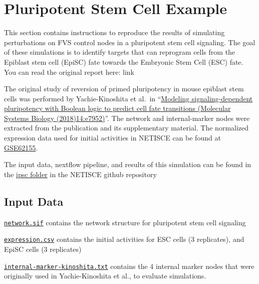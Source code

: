 \documentclass[
]{book}
\begin{document}
\hypertarget{pluripotent-stem-cell-example}{%
\chapter{Pluripotent Stem Cell Example}\label{pluripotent-stem-cell-example}}

This section contains instructions to reproduce the results of simulating perturbations on FVS control nodes in a pluripotent stem cell signaling. The goal of these simulations is to identify targets that can reprogram cells from the Epiblast stem cell (EpiSC) fate towards the Embryonic Stem Cell (ESC) fate. You can read the original report here: link

The original study of reversion of primed pluripotency in mouse epiblast stem cells was performed by Yachie-Kinoshita et al.~in ``\href{https://www.embopress.org/doi/full/10.15252/msb.20177952}{Modeling signaling-dependent pluripotency with Boolean logic to predict cell fate transitions (Molecular Systems Biology (2018)14:e7952)}''. The network and internal-marker nodes were extracted from the publication and its supplementary material. The normalized expression data used for initial activities in NETISCE can be found at \href{https://www.ncbi.nlm.nih.gov/geo/query/acc.cgi?acc=GSE62155}{GSE62155}.

The input data, nextflow pipeline, and results of this simulation can be found in the \href{https://github.com/VeraLiconaResearchGroup/Netisce/tree/main/ipsc_validation}{ipsc folder} in the NETISCE github repository

\hypertarget{input-data-1}{%
\section{Input Data}\label{input-data-1}}

\href{https://github.com/VeraLiconaResearchGroup/Netisce/blob/main/ipsc_validation/input_data/network.sif}{\texttt{network.sif}} contains the network structure for pluripotent stem cell signaling

\href{https://github.com/VeraLiconaResearchGroup/Netisce/blob/main/ipsc_validation/input_data/expression.csv}{\texttt{expression.csv}} contains the initial activities for ESC cells (3 replicates), and EpiSC cells (3 replicates)

\href{https://github.com/VeraLiconaResearchGroup/Netisce/blob/main/ipsc_validation/input_data/internal-marker-kinoshita.txt}{\texttt{internal-marker-kinoshita.txt}} contains the 4 internal marker nodes that were originally used in Yachie-Kinoshita et al., to evaluate simulations.
\end{document}
